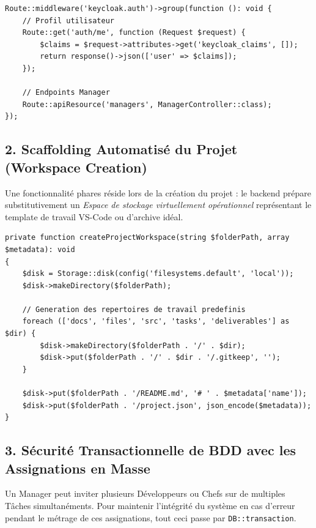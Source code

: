 \begin{lstlisting}[language=PHP_Laravel, caption={Extrait des routes s\'{e}curis\'{e}es (routes/api.php)}]
Route::middleware('keycloak.auth')->group(function (): void {
    // Profil utilisateur
    Route::get('auth/me', function (Request $request) {
        $claims = $request->attributes->get('keycloak_claims', []);
        return response()->json(['user' => $claims]);
    });

    // Endpoints Manager
    Route::apiResource('managers', ManagerController::class);
});
\end{lstlisting}

\subsection{2. Scaffolding Automatis\'{e} du Projet (Workspace Creation)}
Une fonctionnalit\'{e} phares r\'{e}side lors de la cr\'{e}ation du projet : le backend pr\'{e}pare
substitutivement un \textit{Espace de stockage virtuellement op\'{e}rationnel} repr\'{e}sentant
le template de travail VS-Code ou d'archive id\'{e}al.

\begin{lstlisting}[language=PHP_Laravel, caption={Cr\'{e}ation du workspace (ManagerController.php)}]
private function createProjectWorkspace(string $folderPath, array $metadata): void
{
    $disk = Storage::disk(config('filesystems.default', 'local'));
    $disk->makeDirectory($folderPath);

    // Generation des repertoires de travail predefinis
    foreach (['docs', 'files', 'src', 'tasks', 'deliverables'] as $dir) {
        $disk->makeDirectory($folderPath . '/' . $dir);
        $disk->put($folderPath . '/' . $dir . '/.gitkeep', '');
    }

    $disk->put($folderPath . '/README.md', '# ' . $metadata['name']);
    $disk->put($folderPath . '/project.json', json_encode($metadata));
}
\end{lstlisting}

\subsection{3. S\'{e}curit\'{e} Transactionnelle de BDD avec les Assignations en Masse}
Un Manager peut inviter plusieurs D\'{e}veloppeurs ou Chefs sur de multiples T\^{a}ches
simultan\'{e}ments. Pour maintenir l'int\'{e}grit\'{e} du syst\`{e}me en cas d'erreur
pendant le m\'{e}trage de ces assignations, tout ceci passe par \texttt{DB::transaction}.

